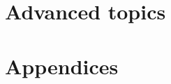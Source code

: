 \documentclass[nofonts, nobib]{tufte-book}
\begin{document}
%

\part{Advanced topics} \label{advancedpart}


%
%
%
%


%


%


%

\part{Appendices}




\end{document}
